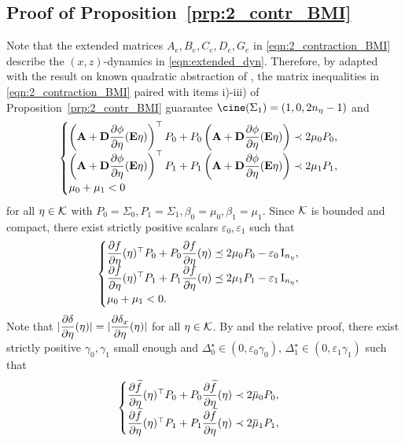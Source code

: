 \documentclass{ifacconf}
\begin{document}
\subsection{Proof of Proposition~\ref{prp:2_contr_BMI}}\label{sec:proof_prp1}
Note that the extended matrices $A_e, B_e, C_e, D_e, G_e$ in \eqref{eqn:2_contraction_BMI} describe the $(x,z)$-dynamics in \eqref{eqn:extended_dyn}. Therefore, by \citep[Theorem 2]{zoboli2024dynamic} adapted with the result on known quadratic abstraction of \citep[Proposition 3]{zoboli2024dynamic}, the matrix inequalities in \eqref{eqn:2_contraction_BMI} paired with items i)-iii) of Proposition~\ref{prp:2_contr_BMI} guarantee $\cine(\Sigma_1)=(1,0,2n_\eta-1)$ and
\begin{equation}
\label{eqn:2_contr_cond_closed_loop}
\begin{cases}
     \left( {\bf{A}}+ {\bf{D}}\dfrac{\partial \phi}{\partial \eta}({\bf{E}}\eta) \right)^\top P_0 +  P_0 \left({\bf{A}}+ {\bf{D}}\dfrac{\partial \phi}{\partial \eta}({\bf{E}}\eta) \right) \prec 2\mu_0 P_0,\\
     \left( {\bf{A}}+ {\bf{D}}\dfrac{\partial \phi}{\partial \eta}({\bf{E}}\eta) \right)^\top P_1 +  P_1 \left({\bf{A}}+ {\bf{D}}\dfrac{\partial \phi}{\partial \eta}({\bf{E}}\eta) \right) \prec 2\mu_1 P_1,\\
     \mu_0+\mu_1<0
\end{cases}
\end{equation}
for all $\eta\in{\mathcal{K}}$ with $P_0=\Sigma_0, P_1=\Sigma_1, \beta_0=\mu_0,\beta_1=\mu_1$. 
Since ${\mathcal{K}}$ is bounded and compact, there exist strictly positive scalars $\varepsilon_0,\varepsilon_1$ such that
\[
\begin{cases}
    \dfrac{\partial  f}{\partial \eta}(\eta)^\top P_0 +  P_0 \dfrac{\partial  f}{\partial \eta}(\eta) \preceq 2\mu_0 P_0 - \varepsilon_0 \operatorname{I}_{n_\eta},\\
    \dfrac{\partial  f}{\partial \eta}(\eta)^\top P_1 +  P_1 \dfrac{\partial  f}{\partial \eta}(\eta)\preceq 2\mu_1 P_1 - \varepsilon_1 \operatorname{I}_{n_\eta},\\
     \mu_0+\mu_1<0.
\end{cases}
\]
Note that $|\dfrac{\partial \delta}{\partial \eta}(\eta)|=|\dfrac{\partial \delta_x}{\partial \eta}(\eta)|$ for all $\eta \in {\mathcal{K}}$. By \citep[Lemma 8]{zoboli2024dynamic} and the relative proof, there exist strictly positive $\gamma_0,\gamma_1$ small enough and $\Delta^\star_0\in (0,\varepsilon_0\gamma_0),\,  \Delta^\star_1\in(0,\varepsilon_1\gamma_1)$ such that 
\[
\begin{cases}
    \pderiv{\widetilde f}{\eta}(\eta)^\top P_0 +  P_0 \pderiv{\widetilde f}{\eta}(\eta) \prec 2\overbar \mu_0 P_0,\\
     \pderiv{\widetilde f}{\eta}(\eta)^\top P_1 +  P_1 \pderiv{\widetilde f}{\eta}(\eta) \prec 2\overbar \mu_1 P_1,
\end{cases}
\]
\end{document}
